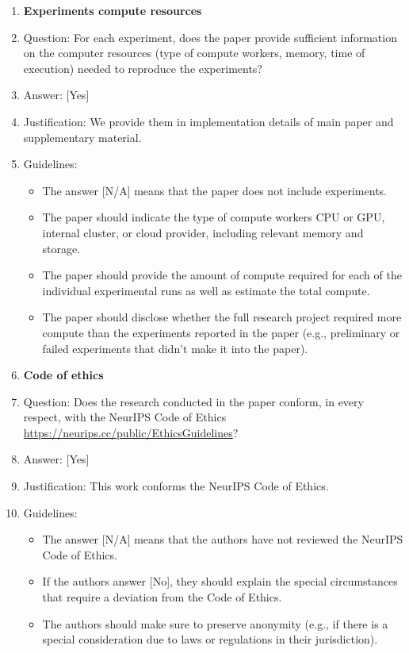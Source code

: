 \documentclass{llmxive}
\providecommand{\answerYes}[1][]{[Yes]#1}
\providecommand{\answerNo}[1][]{[No]#1}
\providecommand{\answerNA}[1][]{[N/A]#1}
\begin{document}
{\begin{enumerate}
\item {\bf Experiments compute resources}
    \item[] Question: For each experiment, does the paper provide sufficient information on the computer resources (type of compute workers, memory, time of execution) needed to reproduce the experiments?
    \item[] Answer: \answerYes{} %
    \item[] Justification: We provide them in implementation details of main paper and supplementary material.
    \item[] Guidelines:
    \begin{itemize}
        \item The answer \answerNA{} means that the paper does not include experiments.
        \item The paper should indicate the type of compute workers CPU or GPU, internal cluster, or cloud provider, including relevant memory and storage.
        \item The paper should provide the amount of compute required for each of the individual experimental runs as well as estimate the total compute. 
        \item The paper should disclose whether the full research project required more compute than the experiments reported in the paper (e.g., preliminary or failed experiments that didn't make it into the paper). 
    \end{itemize}
    
\item {\bf Code of ethics}
    \item[] Question: Does the research conducted in the paper conform, in every respect, with the NeurIPS Code of Ethics \url{https://neurips.cc/public/EthicsGuidelines}?
    \item[] Answer: \answerYes{} %
    \item[] Justification: This work conforms the NeurIPS Code of Ethics.
    \item[] Guidelines:
    \begin{itemize}
        \item The answer \answerNA{} means that the authors have not reviewed the NeurIPS Code of Ethics.
        \item If the authors answer \answerNo, they should explain the special circumstances that require a deviation from the Code of Ethics.
        \item The authors should make sure to preserve anonymity (e.g., if there is a special consideration due to laws or regulations in their jurisdiction).
    \end{itemize}



\end{enumerate}}
\end{document}
